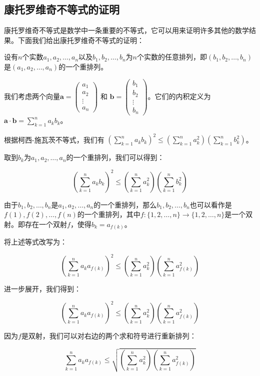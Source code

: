 \documentclass[UTF8]{ctexart}
\begin{document}
\subsection*{康托罗维奇不等式的证明}

康托罗维奇不等式是数学中一条重要的不等式，它可以用来证明许多其他的数学结果。下面我们给出康托罗维奇不等式的证明：

设有$n$个实数$a_1, a_2, \dots, a_n$以及$b_1, b_2, \dots, b_n$为$n$个实数的任意排列，即$(b_1, b_2, \dots, b_n)$是$(a_1, a_2, \dots, a_n)$的一个重排列。

我们考虑两个向量$ \mathbf{a} = \begin{pmatrix} a_1 \\ a_2 \\ \vdots \\ a_n \end{pmatrix} $ 和 $\mathbf{b} = \begin{pmatrix} b_1 \\ b_2 \\ \vdots \\ b_n \end{pmatrix} $。它们的内积定义为 $\mathbf{a} \cdot \mathbf{b} = \sum_{k=1}^{n} a_k b_k$。

根据柯西-施瓦茨不等式，我们有 $\left( \sum_{k=1}^{n} a_k b_k \right)^2 \leq \left( \sum_{k=1}^{n} a_k^2 \right) \left( \sum_{k=1}^{n} b_k^2 \right)$。

取到$b_k$为$a_1, a_2, \dots, a_n$的一个重排列，我们可以得到：

\[
    \left( \sum_{k=1}^{n} a_k b_k \right)^2 \leq \left( \sum_{k=1}^{n} a_k^2 \right) \left( \sum_{k=1}^{n} b_k^2 \right)
\]

由于$b_1, b_2, \dots, b_n$是$a_1, a_2, \dots, a_n$的一个重排列，那么$b_1, b_2, \dots, b_n$也可以看作是$f(1), f(2), \dots, f(n)$的一个重排列，其中$f:\{1,2,\dots,n\} \rightarrow \{1,2,\dots,n\}$是一个双射。即存在一个双射$f$，使得$b_k=a_{f(k)}$。

将上述等式改写为：

\[
    \left( \sum_{k=1}^{n} a_k a_{f(k)} \right)^2 \leq \left( \sum_{k=1}^{n} a_k^2 \right) \left( \sum_{k=1}^{n} a_{f(k)}^2 \right)
\]

进一步展开，我们得到：

\[
    \left( \sum_{k=1}^{n} a_k a_{f(k)} \right)^2 \leq \left( \sum_{k=1}^{n} a_k^2 \right) \left( \sum_{k=1}^{n} a_{f(k)}^2 \right)
\]

因为$f$是双射，我们可以对右边的两个求和符号进行重新排列：

\[
    \sum_{k=1}^{n} a_k a_{f(k)} \leq \sqrt{\left( \sum_{k=1}^{n} a_k^2 \right) \left( \sum_{k=1}^{n} a_{f(k)}^2 \right)}
\]
\end{document}
